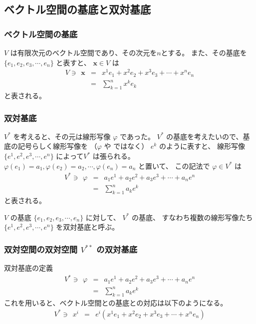 \documentclass[uplatex,a4j,12pt,dvipdfmx]{jsarticle}
\begin{document}
\subsection{ベクトル空間の基底と双対基底}

\subsubsection{ベクトル空間の基底}

$V$ は有限次元のベクトル空間であり、その次元を$n$とする。
また、その基底を$\{ e_{1}, e_{2}, e_{3}, \cdots , e_{n} \}$
と表すと、
$\mathbf{x} \in V$ は
\[
	\begin{array}{rcl}
		V \ni \ \
		\mathbf{x}
		 & = &
		x^{1} e_{1} + x^{2} e_{2} + x^{3} e_{3} + \cdots + x^{n} e_{n}
		\\
		 & = &
		\displaystyle \sum_{k=1}^{n} x^{k} e_{k}
	\end{array}
\]
と表される。

\subsubsection{双対基底}

$V^{*}$ を考えると、その元は線形写像 $\varphi$ であった。
$V^{*}$ の基底を考えたいので、基底の記号らしく線形写像を （$\varphi$ や ではなく） $e^{k}$ のように表すと、
線形写像$\{ e^{1}, e^{2}, e^{3}, \cdots , e^{n} \}$ によって$V^{*}$ は張られる。
$\varphi(e_{1}) = a_{1}, \varphi(e_{2}) = a_{2}, \cdots ,\varphi(e_{n}) = a_{n}$ と置いて、
この記法で
$\varphi \in V^{*}$ は
\[
	\begin{array}{rcl}
		V^{*} \ni \ \ \varphi
		 & = &
		a_{1} e^{1} + a_{2} e^{2} + a_{3} e^{3} + \cdots + a_{n} e^{n}
		\\
		 & = &
		\displaystyle \sum_{k=1}^{n} a_{k} e^{k}
	\end{array}
\]
と表される。

$V$ の基底
$\{ e_{1}, e_{2}, e_{3}, \cdots , e_{n} \}$
に対して、
$V^{*}$ の基底、
すなわち複数の線形写像たち
$\{ e^{1}, e^{2}, e^{3}, \cdots , e^{n} \}$
を双対基底と呼ぶ。

\subsubsection{双対空間の双対空間 $V^{**}$ の双対基底}

双対基底の定義
\[
	\begin{array}{rcl}
		V^{*} \ni \ \ \varphi
		 & = &
		a_{1} e^{1} + a_{2} e^{2} + a_{3} e^{3} + \cdots + a_{n} e^{n}
		\\
		 & = &
		\displaystyle \sum_{k=1}^{n} a_{k} e^{k}
	\end{array}
\]
これを用いると、ベクトル空間との基底との対応は以下のようになる。
\[
	\begin{array}{rcl}
		V^{*} \ni \ \ x^{i}
		 & = &
		e^{i} (x^{1} e_{1} + x^{2} e_{2} + x^{3} e_{3} + \cdots + x^{n} e_{n})
	\end{array}
\]
\end{document}
